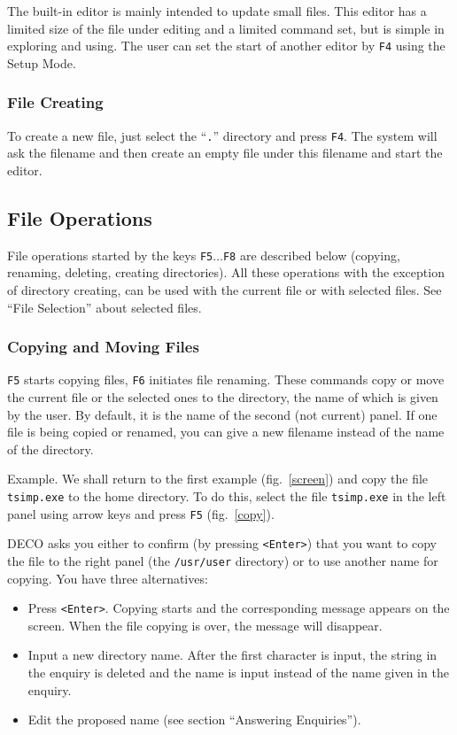 The built-in editor is mainly intended to update small 
files. This editor has a limited size of the file under 
editing and a limited command set, but is simple in 
exploring and using. The user can set the start of 
another editor by {\tt F4} using the Setup Mode.

\subsubsection{File Creating}

To create a new file, just select the ``{\tt .}'' directory and
press {\tt F4}. The system will ask the filename and then
create an empty file under this filename and start the editor.

\subsection{File Operations}

File operations started by the keys {\tt F5}$\ldots${\tt F8} are described
below (copying, renaming, deleting, creating directories). All these
operations with the exception of directory creating, can be used with the
current file or with selected files. See ``File Selection''
about selected files.

\subsubsection{Copying and Moving Files}

{\tt F5} starts copying files, {\tt F6} initiates file renaming. These
commands copy or move the current file or the selected ones to the directory,
the name of which is given by the user. By default, it is the name of
the second (not current) panel. If one file is being copied or renamed,
you can give a new filename instead of the name of the directory.

Example. We shall return to the first example (fig.~\ref{screen}) and copy
the file {\tt tsimp.exe} to the home directory. To do this, select the file
{\tt tsimp.exe} in the left panel using arrow keys and press {\tt F5}
(fig.~\ref{copy}).


DECO asks you either to confirm (by pressing {\tt <Enter>}) that you want to copy
the file to the right panel (the {\tt /usr/user} directory) or to use
another name for copying. You have three alternatives:

\begin{itemize}
\item
Press {\tt <Enter>}. Copying starts and the corresponding message appears on the
screen. When the file copying is over, the message will disappear.
\item
Input a new directory name. After the first character is input, the string
in the enquiry is deleted and the name is input instead of the name given
in the enquiry.
\item
Edit the proposed name (see section ``Answering Enquiries'').
\end{itemize}

